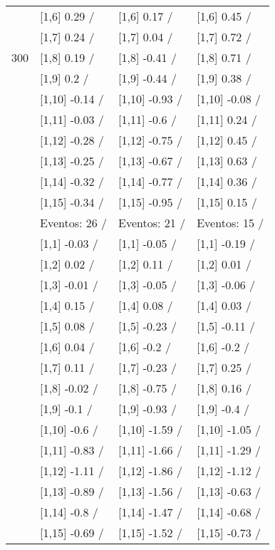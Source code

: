 \begin{table}
\begin{tabular}[t]{llll}
 & {}[1,6] 0.29  / & {}[1,6] 0.17  / & {}[1,6] 0.45  /\\
 & {}[1,7] 0.24  / & {}[1,7] 0.04  / & {}[1,7] 0.72  /\\
300 & {}[1,8] 0.19  / & {}[1,8] -0.41  / & {}[1,8] 0.71  /\\
\addlinespace
 & {}[1,9] 0.2  / & {}[1,9] -0.44  / & {}[1,9] 0.38  /\\
 & {}[1,10] -0.14  / & {}[1,10] -0.93  / & {}[1,10] -0.08  /\\
 & {}[1,11] -0.03  / & {}[1,11] -0.6  / & {}[1,11] 0.24  /\\
 & {}[1,12] -0.28  / & {}[1,12] -0.75  / & {}[1,12] 0.45  /\\
 & {}[1,13] -0.25  / & {}[1,13] -0.67  / & {}[1,13] 0.63  /\\
\addlinespace
 & {}[1,14] -0.32  / & {}[1,14] -0.77  / & {}[1,14] 0.36  /\\
 & {}[1,15] -0.34  / & {}[1,15] -0.95  / & {}[1,15] 0.15  /\\
 & Eventos:  26 / & Eventos:  21 / & Eventos:  15 /\\
 & {}[1,1] -0.03  / & {}[1,1] -0.05  / & {}[1,1] -0.19  /\\
 & {}[1,2] 0.02  / & {}[1,2] 0.11  / & {}[1,2] 0.01  /\\
\addlinespace
 & {}[1,3] -0.01  / & {}[1,3] -0.05  / & {}[1,3] -0.06  /\\
 & {}[1,4] 0.15  / & {}[1,4] 0.08  / & {}[1,4] 0.03  /\\
 & {}[1,5] 0.08  / & {}[1,5] -0.23  / & {}[1,5] -0.11  /\\
 & {}[1,6] 0.04  / & {}[1,6] -0.2  / & {}[1,6] -0.2  /\\
 & {}[1,7] 0.11  / & {}[1,7] -0.23  / & {}[1,7] 0.25  /\\
\addlinespace
500 & {}[1,8] -0.02  / & {}[1,8] -0.75  / & {}[1,8] 0.16  /\\
 & {}[1,9] -0.1  / & {}[1,9] -0.93  / & {}[1,9] -0.4  /\\
 & {}[1,10] -0.6  / & {}[1,10] -1.59  / & {}[1,10] -1.05  /\\
 & {}[1,11] -0.83  / & {}[1,11] -1.66  / & {}[1,11] -1.29  /\\
 & {}[1,12] -1.11  / & {}[1,12] -1.86  / & {}[1,12] -1.12  /\\
\addlinespace
 & {}[1,13] -0.89  / & {}[1,13] -1.56  / & {}[1,13] -0.63  /\\
 & {}[1,14] -0.8  / & {}[1,14] -1.47  / & {}[1,14] -0.68  /\\
 & {}[1,15] -0.69  / & {}[1,15] -1.52  / & {}[1,15] -0.73  /\\
\bottomrule
\end{tabular}
\end{table}
